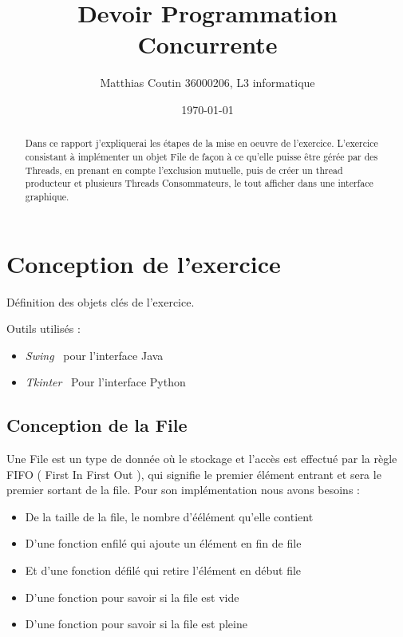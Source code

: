 \documentclass{article}
\title{Devoir Programmation Concurrente}
\author{Matthias Coutin 36000206, L3 informatique}
\date{\today}
\begin{document}
\maketitle %


\begin{abstract}
 Dans ce rapport j'expliquerai les étapes de la mise en oeuvre de l'exercice. L'exercice consistant à implémenter un objet File de façon à ce qu'elle puisse être gérée par des Threads,  en prenant en compte l'exclusion mutuelle, puis de créer un thread producteur et plusieurs Threads Consommateurs, le tout afficher dans une interface graphique.
\end{abstract}

\section{Conception de l'exercice}
\label{section:hello} %

Définition des objets clés de l'exercice.

Outils utilisés :
\begin{itemize}
\item \textit{Swing}~\cite{swingDoc}
  pour l'interface Java
\item \textit{Tkinter}~\cite{tkinterDoc} Pour l'interface Python
\end{itemize}

\subsection{Conception de la File}


Une File est un type de donnée où le stockage et l'accès est effectué 
par la règle FIFO ( First In First Out ), qui signifie le premier élément entrant et sera le premier sortant de la file. Pour son implémentation nous avons besoins : 
\begin{itemize}
\item De la taille de la file, le nombre d'éélément qu'elle contient
\item D'une fonction enfilé qui ajoute un élément en fin de file
\item Et d'une fonction défilé qui retire l'élément en début file
\item D'une fonction pour savoir si la file est vide
\item D'une fonction pour savoir si la file est pleine
\end{itemize}
\end{document}
